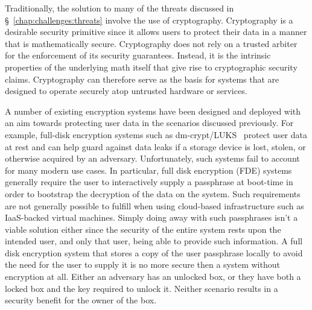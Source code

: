 Traditionally, the solution to many of the threats discussed in
\S~\ref{chap:challenges:threats} involve the use of
cryptography. Cryptography is a desirable security primitive since it
allows users to protect their data in a manner that is mathematically
secure. Cryptography does not rely on a trusted arbiter for the
enforcement of its security guarantees. Instead, it is the intrinsic
properties of the underlying math itself that give rise to
cryptographic security claims. Cryptography can therefore serve as the
basis for systems that are designed to operate securely atop untrusted
hardware or services.

A number of existing encryption systems have been designed and
deployed with an aim towards protecting user data in the scenarios
discussed previously. For example, full-disk encryption systems such
as dm-crypt/LUKS~\cite{dm-crypt, luks} protect user data at rest and
can help guard against data leaks if a storage device is lost, stolen,
or otherwise acquired by an adversary. Unfortunately, such systems
fail to account for many modern use cases. In particular, full disk
encryption (FDE) systems generally require the user to interactively
supply a passphrase at boot-time in order to bootstrap the decryption
of the data on the system. Such requirements are not generally
possible to fulfill when using cloud-based infrastructure such as
IaaS-backed virtual machines. Simply doing away with such passphrases
isn't a viable solution either since the security of the entire system
rests upon the intended user, and only that user, being able to
provide such information. A full disk encryption system that stores a
copy of the user passphrase locally to avoid the need for the user to
supply it is no more secure then a system without encryption at
all. Either an adversary has an unlocked box, or they have both a
locked box and the key required to unlock it. Neither scenario results
in a security benefit for the owner of the box.

